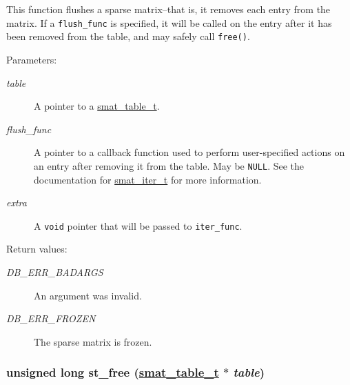 This function flushes a sparse matrix--that is, it removes each entry from the matrix. If a {\tt flush\_\-func} is specified, it will be called on the entry after it has been removed from the table, and may safely call {\tt free()}.\begin{Desc}
\item[Parameters: ]\par
\begin{description}
\item[{\em 
table}]A pointer to a \hyperlink{group__dbprim__smat_a0}{smat\_\-table\_\-t}. \item[{\em 
flush\_\-func}]A pointer to a callback function used to perform user-specified actions on an entry after removing it from the table. May be {\tt NULL}. See the documentation for \hyperlink{group__dbprim__smat_a4}{smat\_\-iter\_\-t} for more information. \item[{\em 
extra}]A {\tt void} pointer that will be passed to {\tt iter\_\-func}.\end{description}
\end{Desc}
\begin{Desc}
\item[Return values: ]\par
\begin{description}
\item[{\em 
DB\_\-ERR\_\-BADARGS}]An argument was invalid. \item[{\em 
DB\_\-ERR\_\-FROZEN}]The sparse matrix is frozen. \end{description}
\end{Desc}
\hypertarget{group__dbprim__smat_a16}{
\subsubsection[st\_\-free]{\setlength{\rightskip}{0pt plus 5cm}unsigned long st\_\-free (\hyperlink{group__dbprim__smat_a0}{smat\_\-table\_\-t} $\ast$ {\em table})}}
\label{group__dbprim__smat_a16}


